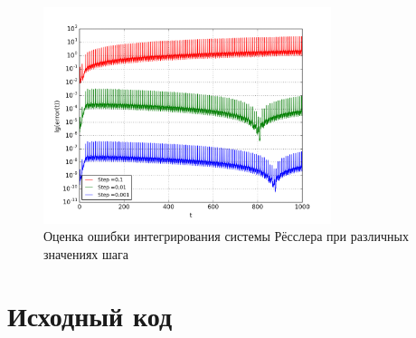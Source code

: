 \documentclass[a4paper]{article}
\begin{document}
\begin{figure}[H]
	\center
	\includegraphics[width=0.75\textwidth]{../pictures/lab3_rossler_system.png}
	\caption{Оценка ошибки интегрирования системы Рёсслера при различных значениях шага}
	\label{fig:rossler_system}
\end{figure}


\section{Исходный код}

\end{document}
